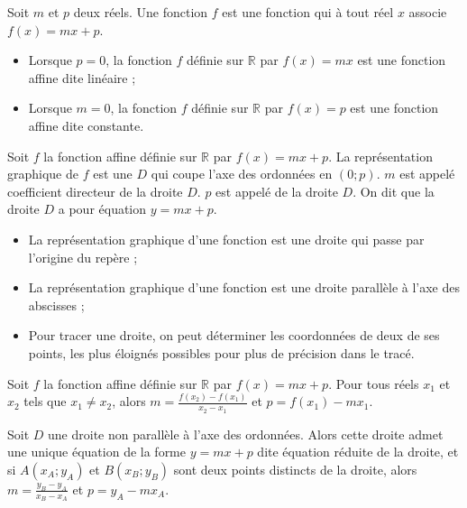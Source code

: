 \documentclass[12pt,a4paper,french]{book}
\begin{document}
\begin{defn}
Soit \( m \) et \( p \) deux réels. Une fonction  \( f \) est une fonction qui à tout réel \( x \) associe \( f(x) = mx + p \).
\end{defn}

\begin{rem}
\begin{itemize}
    \item Lorsque \( p = 0 \), la fonction \( f \) définie sur \( \mathbb{R} \) par \( f(x) = mx \) est une fonction affine dite linéaire ;
    \item Lorsque \( m = 0 \), la fonction \( f \) définie sur \( \mathbb{R} \) par \( f(x) = p \) est une fonction affine dite constante.
\end{itemize}
\end{rem}

\begin{prop}
Soit \( f \) la fonction affine définie sur \( \mathbb{R} \) par \( f(x) = mx + p \). La représentation graphique de \( f \) est une  \( D \) qui coupe l’axe des ordonnées en \( (0 ; p) \). \( m \) est appelé coefficient directeur de la droite \( D \). \( p \) est appelé  de la droite \( D \). On dit que la droite \( D \) a pour équation \( y = mx + p \).
\end{prop}

\begin{rem}
\begin{itemize}
    \item La représentation graphique d’une fonction  est une droite qui passe par l’origine du repère ;
    \item La représentation graphique d’une fonction  est une droite parallèle à l’axe des abscisses ;
    \item Pour tracer une droite, on peut déterminer les coordonnées de deux de ses points, les plus éloignés possibles pour plus de précision dans le tracé.
\end{itemize}
\end{rem}

\begin{prop}
Soit \( f \) la fonction affine définie sur \( \mathbb{R} \) par \( f(x) = mx + p \). Pour tous réels \( x_1 \) et \( x_2 \) tels que \( x_1 \neq x_2 \), alors \( m = \frac{f(x_2) - f(x_1)}{x_2 - x_1} \) et \( p = f(x_1) - mx_1 \).

Soit \( D \) une droite non parallèle à l’axe des ordonnées. Alors cette droite admet une unique équation de la forme \( y = mx + p \) dite équation réduite de la droite, et si \( A(x_A ; y_A) \) et \( B(x_B ; y_B) \) sont deux points distincts de la droite, alors \( m = \frac{y_B - y_A}{x_B - x_A} \) et \( p = y_A - mx_A \).
\end{prop}
\end{document}
